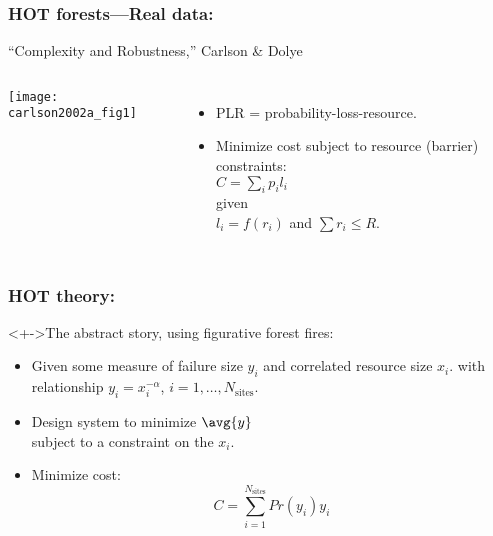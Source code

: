\begin{frame}
  \frametitle{HOT forests---Real data:}

  \begin{block}{``Complexity and Robustness,'' Carlson \& Dolye\cite{carlson2002a}}
    \begin{columns}
      \texttt{[image: carlson2002a\_fig1]}
      \begin{itemize}
      \item 
        PLR = probability-loss-resource.
      \item 
        Minimize cost subject to resource (barrier) constraints: \\
        $
        C = \sum_{i} p_i l_i 
        $\\
        given\\
        $
        l_i = f(r_i)
        $
        and
        $
        \sum r_i \le R.
        $
      \end{itemize}
    \end{columns}
  \end{block}



\end{frame}

\begin{frame}
  \frametitle{HOT theory:}

  \begin{block}<+->{The abstract story, using figurative forest fires:}
    \begin{itemize}
    \item<+-> 
      Given some measure of failure size $y_i$ and
      correlated resource size $x_i$.
      with relationship $y_i = x_i^{-\alpha}$, $i=1,\ldots,N_{\textrm{sites}}$.
    \item<+-> 
      Design system to minimize $\avg{y}$\\
      subject to a constraint on the $x_i$.
    \item<3-> Minimize cost:
      $$ 
      C = \sum_{i=1}^{N_{\textrm{sites}}} Pr(y_i) y_i 
      $$
    \end{itemize}  
  \end{block}

\end{frame}

